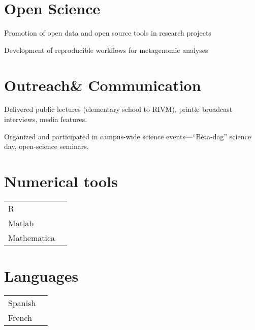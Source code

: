 \documentclass[a4paper,10pt]{article}
\begin{document}
\section*{Open Science}
\begin{description}
\raggedright
\item Promotion of open data and open source tools in research projects
\item Development of reproducible workflows for metagenomic analyses
\end{description}

\section*{Outreach\& Communication}
\begin{description}
\raggedright
\item Delivered public lectures (elementary school to RIVM), print\& broadcast interviews, media features.
\item Organized and participated in campus-wide science events—“Bèta-dag” science day, open-science seminars.
\end{description}

\MySkip

\begin{multicols}{2}
\section*{Numerical tools}
\begin{tabular}{ll}
R              & \SkillBull{$\bullet\bullet\bullet\,\circ$} \\
Matlab         & \SkillBull{$\bullet\bullet\bullet\,\circ$} \\
Mathematica    & \SkillBull{$\bullet\,\circ\,\circ\,\circ$} \\
\end{tabular}

\vfill\null \columnbreak

\section*{Languages}
\begin{tabular}{ll}
  Spanish        & \SkillBull{$\bullet \bullet \bullet \, \circ$}\\
  French         & \SkillBull{$\bullet \, \circ \, \circ \, \circ$}\\
\end{tabular}

\end{multicols}

\LastUpdate
\end{document}
